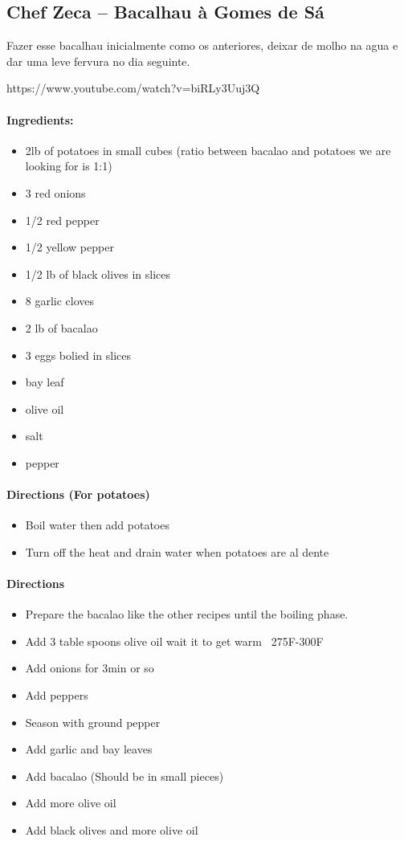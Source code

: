 \documentclass{article}
\begin{document}
\subsection{Chef Zeca – Bacalhau à Gomes de Sá}

Fazer esse bacalhau inicialmente como os anteriores, deixar de molho na agua e dar uma leve fervura no dia seguinte.

https://www.youtube.com/watch?v=biRLy3Uuj3Q

\paragraph{Ingredients:}

\begin{itemize}
	\item 2lb of potatoes in small cubes (ratio between bacalao and potatoes we are looking for is 1:1)
	\item 3 red onions
	\item 1/2 red pepper
	\item 1/2 yellow pepper
	\item 1/2 lb of black olives in slices
	\item 8 garlic cloves
	\item 2 lb of bacalao
	\item 3 eggs bolied in slices
	\item bay leaf
	\item olive oil
	\item salt
	\item pepper
\end{itemize}

\paragraph{Directions (For potatoes)}
\begin{itemize}
	\item Boil water then add potatoes
	\item Turn off the heat and drain water when potatoes are al dente
\end{itemize}

\paragraph{Directions}
\begin{itemize}
	\item Prepare the bacalao like the other recipes until the boiling phase.
	\item Add 3 table spoons olive oil wait it to get warm ~275F-300F
	\item Add onions for 3min or so
	\item Add peppers
	\item Season with ground pepper
	\item Add garlic and bay leaves
	\item Add bacalao (Should be in small pieces)
	\item Add more olive oil
	\item Add black olives and more olive oil
\end{itemize}
\end{document}
